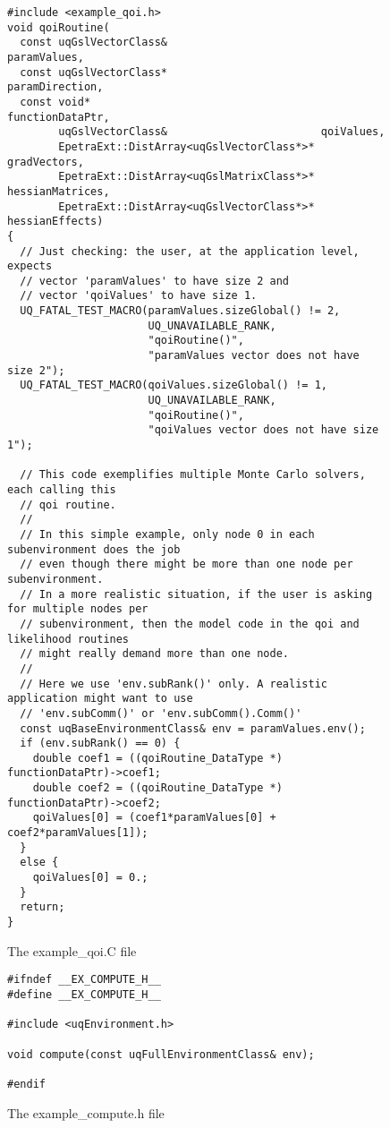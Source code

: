 \begin{figure}[h!]
\begin{center}
\begin{verbatim}
#include <example_qoi.h>
void qoiRoutine(
  const uqGslVectorClass&                        paramValues,
  const uqGslVectorClass*                        paramDirection,
  const void*                                    functionDataPtr,
        uqGslVectorClass&                        qoiValues,
        EpetraExt::DistArray<uqGslVectorClass*>* gradVectors,
        EpetraExt::DistArray<uqGslMatrixClass*>* hessianMatrices,
        EpetraExt::DistArray<uqGslVectorClass*>* hessianEffects)
{
  // Just checking: the user, at the application level, expects
  // vector 'paramValues' to have size 2 and
  // vector 'qoiValues' to have size 1.
  UQ_FATAL_TEST_MACRO(paramValues.sizeGlobal() != 2,
                      UQ_UNAVAILABLE_RANK,
                      "qoiRoutine()",
                      "paramValues vector does not have size 2");
  UQ_FATAL_TEST_MACRO(qoiValues.sizeGlobal() != 1,
                      UQ_UNAVAILABLE_RANK,
                      "qoiRoutine()",
                      "qoiValues vector does not have size 1");

  // This code exemplifies multiple Monte Carlo solvers, each calling this
  // qoi routine.
  //
  // In this simple example, only node 0 in each subenvironment does the job
  // even though there might be more than one node per subenvironment.
  // In a more realistic situation, if the user is asking for multiple nodes per
  // subenvironment, then the model code in the qoi and likelihood routines
  // might really demand more than one node.
  //
  // Here we use 'env.subRank()' only. A realistic application might want to use
  // 'env.subComm()' or 'env.subComm().Comm()'
  const uqBaseEnvironmentClass& env = paramValues.env();
  if (env.subRank() == 0) {
    double coef1 = ((qoiRoutine_DataType *) functionDataPtr)->coef1;
    double coef2 = ((qoiRoutine_DataType *) functionDataPtr)->coef2;
    qoiValues[0] = (coef1*paramValues[0] + coef2*paramValues[1]);
  }
  else {
    qoiValues[0] = 0.;
  }
  return;
}
\end{verbatim}
\end{center}
\caption{
The example\_qoi.C file
}
\label{fig-qoi-c}
\end{figure}

\begin{figure}[h!]
\begin{center}
\begin{verbatim}
#ifndef __EX_COMPUTE_H__
#define __EX_COMPUTE_H__

#include <uqEnvironment.h>

void compute(const uqFullEnvironmentClass& env);

#endif
\end{verbatim}
\end{center}
\caption{
The example\_compute.h file
}
\label{fig-compute-h}
\end{figure}


